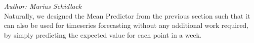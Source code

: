\textit{Author: Marius Schidlack} \\
\label{sec:mean_predictor_predictions}
Naturally, we designed the Mean Predictor from the previous section such that it can also be used for timeseries forecasting without any additional work required, by simply predicting the expected value for each point in a week.